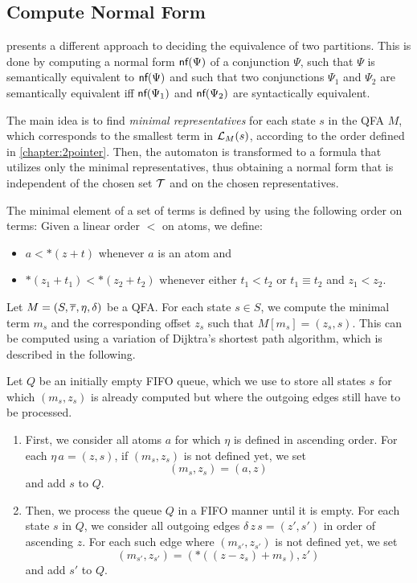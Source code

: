 \subsection{Compute Normal Form}

\textcite{2pointer} presents a different approach to deciding the equivalence of two partitions.
This is done by computing a normal form $\textsf{nf}(\Psi)$ of a conjunction $\Psi$, such that $\Psi$ is semantically equivalent to $\textsf{nf}(\Psi)$ and such that two conjunctions $\Psi_1$ and $\Psi_2$ are semantically equivalent iff $\textsf{nf}(\Psi_1)$ and $\textsf{nf}(\Psi_2)$ are syntactically equivalent.

The main idea is to find \emph{minimal representatives} for each state $s$ in the QFA $M$,
which corresponds to the smallest term in $\mathcal{L}_{M}(s)$, according to the order defined in \cref{chapter:2pointer}.
Then, the automaton is transformed to a formula that utilizes only the minimal representatives, thus obtaining a normal form that is independent of the chosen set $\mathcal{T}$ and on the chosen representatives.

The minimal element of a set of terms is defined by using the following order on terms:
Given a linear order $<$ on atoms, we define:
\begin{itemize}
    \item $a < *(z+t)$ whenever $a$ is an atom and
    \item $*(z_1 + t_1) < *(z_2 + t_2)$ whenever either $t_1 < t_2$ or $t_1 \equiv t_2$ and $z_1 < z_2$.
\end{itemize}



Let $M = (S, \overline{\tau}, \eta, \delta)$ be a QFA.\@
For each state $s \in S$, we compute the minimal term $m_s$ and the corresponding offset $z_s$ such that $M[m_s] = (z_s,s)$.
This can be computed using a variation of Dijktra's shortest path algorithm, which is described in the following.

Let $Q$ be an initially empty FIFO queue, which we use to store all states $s$ for which $(m_s,z_s)$ is already computed but where the outgoing edges still have to be processed.

\begin{enumerate}
    \item
          First, we consider all atoms $a$ for which $\eta$ is defined in ascending order. For each $\eta\,a = (z,s)$, if $(m_s,z_s)$ is not defined yet, we set
          \[
              (m_s,z_s) = (a,z)
          \]
          and add $s$ to $Q$.
    \item
          Then, we process the queue $Q$ in a FIFO manner until it is empty.
          For each state $s$ in $Q$, we consider all outgoing edges $\delta\,z\,s = (z',s')$ in order of ascending $z$.
          For each such edge where $(m_{s'},z_{s'})$ is not defined yet, we set
          \[
              (m_{s'},z_{s'}) = (*((z-z_s)+m_s),z')
          \]
          and add $s'$ to $Q$.
\end{enumerate}

